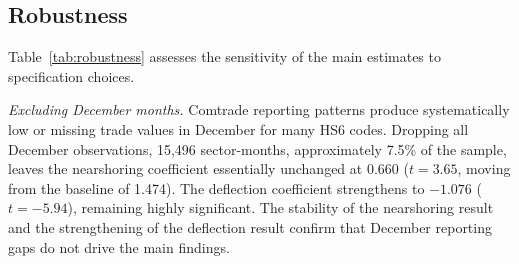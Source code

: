 \documentclass[11pt]{article}
\begin{document}
\FloatBarrier
\subsection{Robustness}

Table~\ref{tab:robustness} assesses the sensitivity of the main estimates
to specification choices.

\textit{Excluding December months.}
Comtrade reporting patterns produce systematically low or missing trade
values in December for many HS6 codes. Dropping all December observations, 15,496 sector-months,
approximately 7.5\% of the sample, leaves the nearshoring coefficient
essentially unchanged at 0.660 ($t = 3.65$, moving from the baseline of
1.474). The deflection coefficient strengthens to $-1.076$ ($t = -5.94$),
remaining highly significant. The stability of the nearshoring result and
the strengthening of the deflection result confirm that December reporting
gaps do not drive the main findings.
\end{document}
